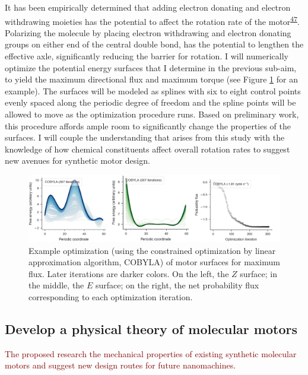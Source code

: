 \documentclass[11pt,notitlepage]{article}
\begin{document}
It has been empirically determined that adding electron donating and
electron withdrawing moieties has the potential to affect the rotation
rate of the
motor\textsuperscript{\protect\hyperlink{ref-1AzLiBVkC}{47}}. Polarizing
the molecule by placing electron withdrawing and electron donating
groups on either end of the central double bond, has the potential to
lengthen the effective axle, significantly reducing the barrier for
rotation. I will numerically optimize the potential energy surfaces that
I determine in the previous sub-aim, to yield the maximum directional
flux and maximum torque (see Figure \ref{fig:COBYLA} for an example).
The surfaces will be modeled as splines with six to eight control points
evenly spaced along the periodic degree of freedom and the spline points
will be allowed to move as the optimization procedure runs. Based on
preliminary work, this procedure affords ample room to significantly
change the properties of the surfaces. I will couple the understanding
that arises from this study with the knowledge of how chemical
constituents affect overall rotation rates to suggest new avenues for
synthetic motor design.

\begin{figure}
\centering
\includegraphics[width=1\textwidth,height=\textheight]{content/images/COBYLA.png}
\caption{Example optimization (using the constrained optimization by
linear approximation algorithm, COBYLA) of motor surfaces for maximum
flux. Later iterations are darker colors. On the left, the \(Z\)
surface; in the middle, the \(E\) surface; on the right, the net
probability flux corresponding to each optimization
iteration.\label{fig:COBYLA}}
\end{figure}

\hypertarget{develop-a-physical-theory-of-molecular-motors}{%
\subsection{Develop a physical theory of molecular
motors}\label{develop-a-physical-theory-of-molecular-motors}}

\textcolor{Maroon}{The proposed research the mechanical properties of existing synthetic molecular motors and suggest new design routes for future nanomachines.}
\end{document}
